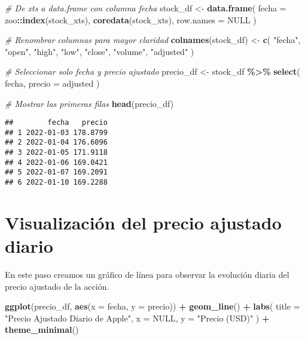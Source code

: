 \documentclass[
  11pt,
]{book}
\newenvironment{Shaded}{\begin{snugshade}}{\end{snugshade}}
\newcommand{\AttributeTok}[1]{\textcolor[rgb]{0.13,0.29,0.53}{#1}}
\newcommand{\CommentTok}[1]{\textcolor[rgb]{0.56,0.35,0.01}{\textit{#1}}}
\newcommand{\ConstantTok}[1]{\textcolor[rgb]{0.56,0.35,0.01}{#1}}
\newcommand{\FunctionTok}[1]{\textcolor[rgb]{0.13,0.29,0.53}{\textbf{#1}}}
\newcommand{\NormalTok}[1]{#1}
\newcommand{\OtherTok}[1]{\textcolor[rgb]{0.56,0.35,0.01}{#1}}
\newcommand{\SpecialCharTok}[1]{\textcolor[rgb]{0.81,0.36,0.00}{\textbf{#1}}}
\newcommand{\StringTok}[1]{\textcolor[rgb]{0.31,0.60,0.02}{#1}}
\begin{document}
\begin{Shaded}
\begin{Highlighting}[]
\CommentTok{\# De xts a data.frame con columna \textquotesingle{}fecha\textquotesingle{}}
\NormalTok{stock\_df }\OtherTok{\textless{}{-}} \FunctionTok{data.frame}\NormalTok{(}
  \AttributeTok{fecha =}\NormalTok{ zoo}\SpecialCharTok{::}\FunctionTok{index}\NormalTok{(stock\_xts),}
  \FunctionTok{coredata}\NormalTok{(stock\_xts),}
  \AttributeTok{row.names =} \ConstantTok{NULL}
\NormalTok{)}

\CommentTok{\# Renombrar columnas para mayor claridad}
\FunctionTok{colnames}\NormalTok{(stock\_df) }\OtherTok{\textless{}{-}} \FunctionTok{c}\NormalTok{(}
  \StringTok{"fecha"}\NormalTok{,}
  \StringTok{"open"}\NormalTok{, }\StringTok{"high"}\NormalTok{, }\StringTok{"low"}\NormalTok{, }\StringTok{"close"}\NormalTok{, }\StringTok{"volume"}\NormalTok{, }\StringTok{"adjusted"}
\NormalTok{)}

\CommentTok{\# Seleccionar solo fecha y precio ajustado}
\NormalTok{precio\_df }\OtherTok{\textless{}{-}}\NormalTok{ stock\_df }\SpecialCharTok{\%\textgreater{}\%}
  \FunctionTok{select}\NormalTok{(}
\NormalTok{    fecha,}
    \AttributeTok{precio =}\NormalTok{ adjusted}
\NormalTok{  )}

\CommentTok{\# Mostrar las primeras filas}
\FunctionTok{head}\NormalTok{(precio\_df)}
\end{Highlighting}
\end{Shaded}

\begin{verbatim}
##        fecha   precio
## 1 2022-01-03 178.8799
## 2 2022-01-04 176.6096
## 3 2022-01-05 171.9118
## 4 2022-01-06 169.0421
## 5 2022-01-07 169.2091
## 6 2022-01-10 169.2288
\end{verbatim}

\section{Visualización del precio ajustado diario}\label{visualizaciuxf3n-del-precio-ajustado-diario}

En este paso creamos un gráfico de línea para observar la evolución diaria del precio ajustado de la acción.

\begin{Shaded}
\begin{Highlighting}[]
\FunctionTok{ggplot}\NormalTok{(precio\_df, }\FunctionTok{aes}\NormalTok{(}\AttributeTok{x =}\NormalTok{ fecha, }\AttributeTok{y =}\NormalTok{ precio)) }\SpecialCharTok{+}
  \FunctionTok{geom\_line}\NormalTok{() }\SpecialCharTok{+}
  \FunctionTok{labs}\NormalTok{(}
    \AttributeTok{title =} \StringTok{"Precio Ajustado Diario de Apple"}\NormalTok{,}
    \AttributeTok{x     =} \ConstantTok{NULL}\NormalTok{,}
    \AttributeTok{y     =} \StringTok{"Precio (USD)"}
\NormalTok{  ) }\SpecialCharTok{+}
  \FunctionTok{theme\_minimal}\NormalTok{()}
\end{Highlighting}
\end{Shaded}
\end{document}
